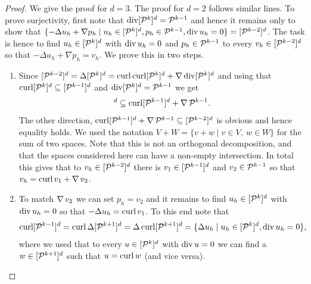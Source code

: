 \documentclass[sn-mathphys,Numbered]{sn-jnl}%
\theoremstyle{remark}%
\theoremstyle{definition}%
\begin{document}
\begin{proof}
  We give the proof for $d=3$. The proof for $d=2$ follows similar lines. 
  To prove surjectivity, first note that $\operatorname{\mathrm{div}} [\mathcal{P}^{k}]^d = \mathcal{P}^{k-1}$ and hence it remains only to show that $\{-\Delta u_h + \nabla p_h \mid u_h\in[\mathcal{P}^k]^d, p_h\in\mathcal{P}^{k-1}, \operatorname{\mathrm{div}} u_h=0\}=[\mathcal{P}^{k-2}]^d$. The task is hence to find $u_h \in [\mathcal{P}^k]^d$ with $\operatorname{\mathrm{div}} u_h = 0$ and $p_h \in \mathcal{P}^{k-1}$ to every $v_h\in [\mathcal{P}^{k-2}]^d$ so that $-\Delta u_h + \nabla p_h = v_h$. We prove this in two steps.
\begin{enumerate}
    \item
    Since
    $[\mathcal{P}^{k-2}]^d=\Delta [\mathcal{P}^{k}]^d=\operatorname{\mathrm{curl}}\operatorname{\mathrm{curl}}[\mathcal{P}^{k}]^d + \operatorname{\nabla}\operatorname{\mathrm{div}}[\mathcal{P}^{k}]^d$ and using that  $\operatorname{\mathrm{curl}}[\mathcal{P}^{k}]^d \subseteq [\mathcal{P}^{k-1}]^d$ and $\operatorname{\mathrm{div}}[\mathcal{P}^{k}]^d = \mathcal{P}^{k-1}$ we get 
    \begin{equation*}
      [\cP^{k-2}]^d \subseteq \Curl[\cP^{k-1}]^d + \Grad\cP^{k-1}.
    \end{equation*}
    The other direction, $\operatorname{\mathrm{curl}}[\mathcal{P}^{k-1}]^d + \operatorname{\nabla}\mathcal{P}^{k-1}
    \subseteq [\mathcal{P}^{k-2}]^d$ is obvious and hence equality holds.
    We used the notation $V+W=\{v+w\mid v\in V,\ w\in W\}$ for the sum of two spaces. Note that this is not an orthogonal decomposition, and that the spaces considered here can have a non-empty intersection. In total this gives that to $v_h\in [\mathcal{P}^{k-2}]^d$ there is $v_1 \in [\mathcal{P}^{k-1}]^d$ and $v_2 \in \mathcal{P}^{k-1}$ so that $v_h = \operatorname{\mathrm{curl}} v_1 + \operatorname{\nabla} v_2$.
    \item To match $\operatorname{\nabla} v_2$ we can set $p_h = v_2$ and it remains to find $u_h \in [\mathcal{P}^k]^d$ with $\operatorname{\mathrm{div}} u_h = 0$ so that $-\Delta u_h = \operatorname{\mathrm{curl}} v_1$. 
    To this end note that 
    \begin{equation*}
      \operatorname{\mathrm{curl}} [\mathcal{P}^{k-1}]^d= \operatorname{\mathrm{curl}} \Delta [\mathcal{P}^{k+1}]^d=  \Delta \operatorname{\mathrm{curl}} [\mathcal{P}^{k+1}]^d = \{\Delta u_h\mid u_h\in[\mathcal{P}^{k}]^d, \operatorname{\mathrm{div}} u_h=0\},
    \end{equation*}
    where we used that to every $u\in[\mathcal{P}^{k}]^d$ with $\operatorname{\mathrm{div}} u=0$ we can find a $w\in[\mathcal{P}^{k+1}]^d$ such that $u=\operatorname{\mathrm{curl}} w$ (and vice versa).

\end{enumerate}
\end{proof}
\end{document}
